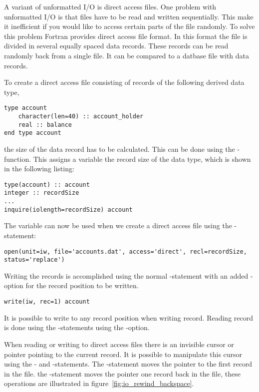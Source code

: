 A variant of unformatted I/O is direct access files. One problem with unformatted I/O is that files have to be read and written sequentially. This make it inefficient if you would like to access certain parts of the file randomly. To solve this problem Fortran provides direct access file format. In this format the file is divided in several equally spaced data records. These records can be read randomly back from a single file. It can be compared to a datbase file with data records. 

To create a direct access file consisting of records of the following derived data type,

\fmode

\begin{lstlisting}
type account
    character(len=40) :: account_holder
	real :: balance
end type account
\end{lstlisting}

the size of the data record has to be calculated. This can be done using the -function. This assigns a variable the record size of the data type, which is shown in the following listing:

\begin{lstlisting}
type(account) :: account
integer :: recordSize
...	
inquire(iolength=recordSize) account
\end{lstlisting}

The  variable can now be used when we create a direct access file using the -statement:

\begin{lstlisting}
open(unit=iw, file='accounts.dat', access='direct', recl=recordSize, status='replace')
\end{lstlisting}

Writing the records is accomplished using the normal -statement with an added -option for the record position to be written.

\begin{lstlisting}
write(iw, rec=1) account
\end{lstlisting}

It is possible to write to any record position when writing record. Reading record is done using the -statements using the -option.

When reading or writing to direct access files there is an invisible cursor or pointer pointing to the current record. It is possible to manipulate this cursor using the - and -statements. The -statement moves the pointer to the first record in the file. the -statement moves the pointer one record back in the file, these operations are illustrated in figure~\ref{fig:io_rewind_backspace}.

